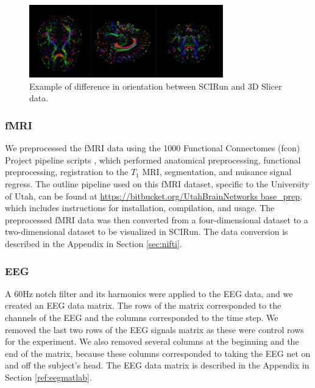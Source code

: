 \begin{figure}[H]
\begin{center}
\includegraphics[width=0.75\textwidth]{Figures/backwards.png}
\caption{Example of difference in orientation between SCIRun and 3D
  Slicer data.}
\label{fig:backwards}
\end{center}
\end{figure}

\subsubsection{fMRI}
\label{sec:fmripre}

We preprocessed the fMRI data using the 1000 Functional Connectomes (fcon) Project pipeline scripts \cite{ref:fcon}, which performed anatomical preprocessing, functional preprocessing, registration to the $T_1$ MRI, segmentation, and nuisance signal regress. The outline pipeline used on this fMRI dataset, specific to the University of Utah, can be found at \url{https://bitbucket.org/UtahBrainNetworks base_prep}, which includes instructions for installation, compilation, and usage. The preprocessed fMRI data was then converted from a four-dimensional dataset to a two-dimensional dataset to be visualized in SCIRun. The data conversion is described in the Appendix in Section \ref{sec:nifti}. 

\subsubsection{EEG}

A 60Hz notch filter and its harmonics \cite{ref:filter} were applied to the EEG data, and we created an EEG data matrix. The rows of the matrix corresponded to the channels of the EEG and the columns corresponded to the time step. We removed the last two rows of the EEG signals matrix as these were control rows for the experiment. We also removed several columns at the beginning and the end of the matrix, because these columns corresponded to taking the EEG net on and off the subject's head. The EEG data matrix is described in the Appendix in Section \ref{ref:eegmatlab}. 

